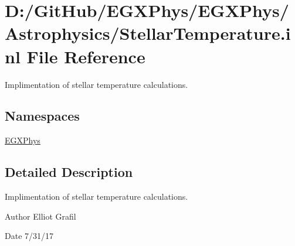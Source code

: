 \hypertarget{_stellar_temperature_8inl}{}\section{D\+:/\+Git\+Hub/\+E\+G\+X\+Phys/\+E\+G\+X\+Phys/\+Astrophysics/\+Stellar\+Temperature.inl File Reference}
\label{_stellar_temperature_8inl}


Implimentation of stellar temperature calculations.  


\subsection*{Namespaces}
\begin{DoxyCompactItemize}
\item 
 \mbox{\hyperlink{namespace_e_g_x_phys}{E\+G\+X\+Phys}}
\end{DoxyCompactItemize}


\subsection{Detailed Description}
Implimentation of stellar temperature calculations. 

\begin{DoxyAuthor}{Author}
Elliot Grafil 
\end{DoxyAuthor}
\begin{DoxyDate}{Date}
7/31/17 
\end{DoxyDate}
